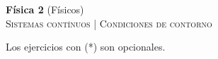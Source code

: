 \documentclass[11pt,spanish,a4paper]{article}
\begin{document}
\begin{center}
\textbf{Física 2} (Físicos) \hfill {}\\
	\textsc{\LARGE Sistemas contínuos | Condiciones de contorno}
\end{center}

Los ejercicios con (*) son opcionales.

\begin{enumerate}






\end{enumerate}
\end{document}
